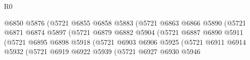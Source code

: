 \begin{lexlean}{R0}
\begin{coremodule}
                                              @6850
                                              @5876
                                              (@5721
                                                @6855
                                                @6858
                                                @5883
                                                (@5721
                                                  @6863
                                                  @6866
                                                  @5890
                                                  (@5721
                                                    @6871
                                                    @6874
                                                    @5897
                                                    (@5721
                                                      @6879
                                                      @6882
                                                      @5904
                                                      (@5721
                                                        @6887
                                                        @6890
                                                        @5911
                                                        (@5721
                                                          @6895
                                                          @6898
                                                          @5918
                                                          (@5721
                                                            @6903
                                                            @6906
                                                            @5925
                                                            (@5721
                                                              @6911
                                                              @6914
                                                              @5932
                                                              (@5721
                                                                @6919
                                                                @6922
                                                                @5939
                                                                (@5721
                                                                  @6927
                                                                  @6930
                                                                  @5946

\end{coremodule}
\end{lexlean}
